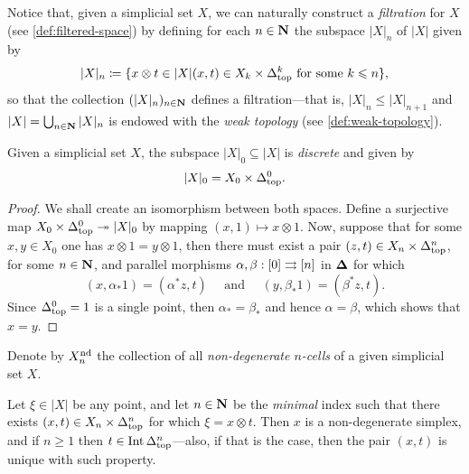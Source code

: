 Notice that, given a simplicial set \(X\), we can naturally construct a
\emph{filtration} for \(X\) (see \cref{def:filtered-space}) by defining for each
\(n \in \mathbf{N}\) the subspace \(|X|_n\) of \(|X|\) given by
\[
    |X|_n \coloneq \{
    x \otimes t \in |X| \relax
    (x, t) \in X_k \times \Delta_{\text{top}}^k
    \text{ for some } k \leqslant n
    \},
\]
so that the collection \((|X|_n)_{n \in \mathbf{N}}\) defines a filtration---that is,
\(|X|_n \leq |X|_{n+1}\) and \(|X| = \bigcup_{n \in \mathbf{N}} |X|_n\) is endowed with
the \emph{weak topology} (see \cref{def:weak-topology}).

\begin{lemma}
    \label{lem:X0-simplicial-set-is-discrete}
    Given a simplicial set \(X\), the subspace \(|X|_0 \subseteq |X|\) is
    \emph{discrete} and given by
    \[
        |X|_0 = X_0 \times \Delta_{\text{top}}^0.
    \]
\end{lemma}

\begin{proof}
    We shall create an isomorphism between both spaces. Define a surjective map
    \(X_0 \times \Delta_{\text{top}}^0 \twoheadrightarrow |X|_0\) by mapping \((x, 1) \mapsto x \otimes
    1\). Now, suppose that for some \(x, y \in X_0\) one has
    \(x \otimes 1 = y \otimes 1\), then there must exist a pair
    \((z, t) \in X_n \times \Delta_{\text{top}}^n\), for some \(n \in \mathbf{N}\), and parallel
    morphisms \(\alpha, \beta: [0] \rightrightarrows [n]\) in \({\mathbf{\Delta}}\) for which
    \[
        (x, \alpha_{*} 1) = (\alpha^{*} z, t)
        \quad \text{ and } \quad
        (y, \beta_{*} 1) = (\beta^{*} z, t).
    \]
    Since \(\Delta_{\text{top}}^0 = 1\) is a single point, then \(\alpha_{*} = \beta_{*}\) and
    hence \(\alpha = \beta\), which shows that \(x = y\).
\end{proof}

\begin{notation}
    \label{not:non-degenerate-cells}
    Denote by \(X_n^{\operatorname{nd}}\) the collection of all \emph{non-degenerate
        \(n\)-cells} of a given simplicial set \(X\).
\end{notation}

\begin{lemma}
    \label{lem:unique-non-degenerate-point-geometric-realization}
    Let \(\xi \in |X|\) be any point, and let \(n \in \mathbf{N}\) be the \emph{minimal}
    index such that there exists \((x, t) \in X_n \times \Delta_{\text{top}}^n\) for which
    \(\xi = x \otimes t\). Then \(x\) is a non-degenerate simplex, and if
    \(n \geq 1\) then \(t \in \operatorname{Int} \Delta_{\text{top}}^n\)---also, if that is the case, then the
    pair \((x, t)\) is unique with such property.
\end{lemma}

